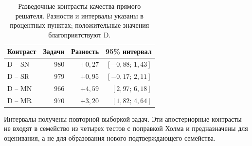 \begin{table}[H]
\caption{Разведочные контрасты качества прямого решателя. Разности и интервалы указаны в процентных пунктах; положительные значения благоприятствуют D.}
\label{tab:direct-contrasts}
\centering\small
\begin{tabular}{@{}lrrr@{}}
\toprule
Контраст & Задачи & Разность & 95\% интервал\\
\midrule
D -- SN & 980 & $+0{,}27$ & $[-0{,}88;\,1{,}43]$\\
D -- SR & 979 & $+0{,}95$ & $[-0{,}17;\,2{,}11]$\\
D -- MN & 966 & $+4{,}59$ & $[2{,}97;\,6{,}18]$\\
D -- MR & 970 & $+3{,}20$ & $[1{,}82;\,4{,}64]$\\
\bottomrule
\end{tabular}
\par\smallskip\noindent Интервалы получены повторной выборкой задач. Эти апостериорные контрасты не входят в семейство из четырех тестов с поправкой Холма и предназначены для оценивания, а не для образования нового подтверждающего семейства.
\end{table}
